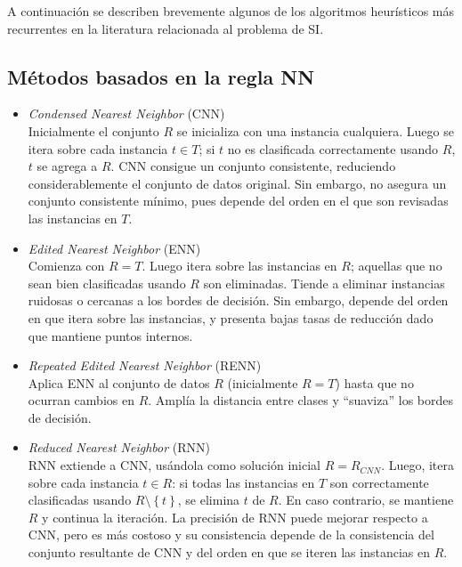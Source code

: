 A continuación se describen brevemente algunos de los algoritmos heurísticos más recurrentes en la literatura relacionada al problema de SI.

\subsection{Métodos basados en la regla NN}

\begin{itemize}
\item \emph{Condensed Nearest Neighbor} (CNN) \cite{Hart:2006:CNN:2263267.2267647}\\
Inicialmente el conjunto $R$ se inicializa con una instancia cualquiera. Luego se itera sobre cada instancia $t \in T$; si $t$ no es clasificada correctamente usando $R$, $t$ se agrega a $R$.
CNN consigue un conjunto consistente, reduciendo considerablemente el conjunto de datos original. Sin embargo, no asegura un conjunto consistente mínimo, pues depende del orden en el que son revisadas las instancias en $T$.
\item \emph{Edited Nearest Neighbor} (ENN) \cite{wilson1972asymptotic}\\
Comienza con $R = T$. Luego itera sobre las instancias en $R$; aquellas que no sean bien clasificadas usando $R$ son eliminadas. Tiende a eliminar instancias ruidosas o cercanas a los bordes de decisión. Sin embargo, depende del orden en que itera sobre las instancias, y presenta bajas tasas de reducción dado que mantiene puntos internos.
\item \emph{Repeated Edited Nearest Neighbor} (RENN) \cite{wilson1972asymptotic}\\
Aplica ENN al conjunto de datos $R$ (inicialmente $R = T$) hasta que no ocurran cambios en $R$. Amplía la distancia entre clases y ``suaviza'' los bordes de decisión.
\item \emph{Reduced Nearest Neighbor} (RNN) \cite{DBLP:journals/tit/Gates72}\\
RNN extiende a CNN, usándola como solución inicial $R = R_{CNN}$. Luego, itera sobre cada instancia $t \in R$: si todas las instancias en $T$ son correctamente clasificadas usando $R\setminus\left\lbrace t \right\rbrace$, se elimina $t$ de $R$. En caso contrario, se mantiene $R$ y continua la iteración. La precisión de RNN puede mejorar respecto a CNN, pero es más costoso y su consistencia depende de la consistencia del conjunto resultante de CNN y del orden en que se iteren las instancias en $R$.
\end{itemize}

